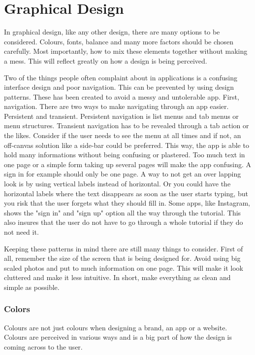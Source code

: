 \section{Graphical Design}
In graphical design, like any other design, there are many options to be considered. Colours, fonts, balance and many more factors should be chosen carefully. Most importantly, how to mix these elements together without making a mess. 
This will reflect greatly on how a design is being perceived. \cite{Colormeaning} 

Two of the things people often complaint about in applications is a confusing interface design and poor navigation. \cite{Pattern} This can be prevented by using design patterns. These has been created to avoid a messy and untolerable app.
First, navigation. There are two ways to make navigating through an app easier. Persistent and transient. Persistent navigation is list menus and tab menus or menu structures. Transient navigation has to be revealed through a tab action or the likes.\cite{Pattern}
Consider if the user needs to see the menu at all times and if not, an off-canvas solution like a side-bar could be preferred.\cite{Pattern} This way, the app is able to hold many informations without being confusing or plastered.  
Too much text in one page or a simple form taking up several pages will make the app confusing. A sign in for example should only be one page. A way to not get an over lapping look is by using vertical labels instead of horizontal. \cite{Pattern} Or you could have the horizontal labels where the text disappears as soon as the user starts typing, but you risk that the user forgets what they should fill in.\cite{Pattern} 
Some apps, like Instagram, shows the "sign in" and "sign up" option all the way through the tutorial. This also insures that the user do not have to go through a whole tutorial if they do not need it. 

Keeping these patterns in mind there are still many things to consider. 
First of all, remember the size of the screen that is being designed for. Avoid using big scaled photos and put to much information on one page. This will make it look cluttered and make it less intuitive. \cite{Graphic}
In short, make everything as clean and simple as possible. 

\subsubsection{Colors}

Colours are not just colours when designing a brand, an app or a website. Colours are perceived in various ways and is a big part of how the design is coming  across to the user. \cite{Colormeaning}


